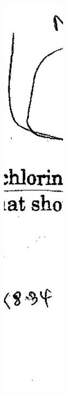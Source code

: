\documentclass[10pt]{article}
\begin{document}
\includegraphics[max width=\textwidth]{2022_11_11_ca6a6c1a0324ee23e523g-53}
\end{document}
